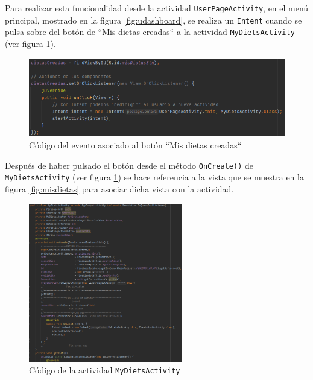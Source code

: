 Para realizar esta funcionalidad desde la actividad \texttt{UserPageActivity}, en el menú principal, mostrado en la figura \ref{fig:udashboard}, se realiza un \texttt{Intent} cuando se pulsa sobre del botón de ``Mis dietas creadas`` a la actividad \texttt{MyDietsActivity} (ver figura \ref{fig:dietascreadas}).

\begin{figure}[H]
    \centering
    \includegraphics[width=\textwidth]{Images/Capitulo7/dietascreadas.png}
        \caption{Código del evento asociado al botón ``Mis dietas creadas``}
    \label{fig:dietascreadas}
\end{figure}

Después de haber pulsado el botón desde el método \texttt{OnCreate()} de \texttt{MyDietsActivity} (ver figura \ref{fig:dietascreadas}) se hace referencia a la vista que se muestra en la figura \ref{fig:misdietas} para asociar dicha vista con la actividad.

\begin{figure}[H]
    \centering
    \includegraphics[width=0.6\textwidth]{Images/Capitulo7/mydietsact.png}
        \caption{Código de la actividad \texttt{MyDietsActivity}}
    \label{fig:mydietsact}
\end{figure}

